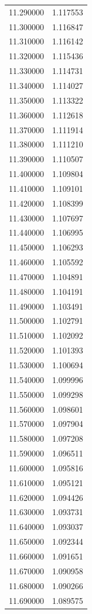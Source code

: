 \begin{tabular}{rr}
11.290000 & 1.117553 \\
11.300000 & 1.116847 \\
11.310000 & 1.116142 \\
11.320000 & 1.115436 \\
11.330000 & 1.114731 \\
11.340000 & 1.114027 \\
11.350000 & 1.113322 \\
11.360000 & 1.112618 \\
11.370000 & 1.111914 \\
11.380000 & 1.111210 \\
11.390000 & 1.110507 \\
11.400000 & 1.109804 \\
11.410000 & 1.109101 \\
11.420000 & 1.108399 \\
11.430000 & 1.107697 \\
11.440000 & 1.106995 \\
11.450000 & 1.106293 \\
11.460000 & 1.105592 \\
11.470000 & 1.104891 \\
11.480000 & 1.104191 \\
11.490000 & 1.103491 \\
11.500000 & 1.102791 \\
11.510000 & 1.102092 \\
11.520000 & 1.101393 \\
11.530000 & 1.100694 \\
11.540000 & 1.099996 \\
11.550000 & 1.099298 \\
11.560000 & 1.098601 \\
11.570000 & 1.097904 \\
11.580000 & 1.097208 \\
11.590000 & 1.096511 \\
11.600000 & 1.095816 \\
11.610000 & 1.095121 \\
11.620000 & 1.094426 \\
11.630000 & 1.093731 \\
11.640000 & 1.093037 \\
11.650000 & 1.092344 \\
11.660000 & 1.091651 \\
11.670000 & 1.090958 \\
11.680000 & 1.090266 \\
11.690000 & 1.089575 \\

\end{tabular}
